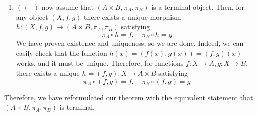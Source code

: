 \begin{example}
\begin{enumerate}
			\item $(\leftarrow)$ now assume that $(A \times B, \pi_A, \pi_B)$ is a terminal object. Then, for any object $(X, f, g)$ there exists a unique morphism $h: (X, f, g) \to (A \times B, \pi_A, \pi_B)$ satisfying 
				\begin{equation}
				  \pi_A \circ h = f, \quad \pi_B \circ h = g
				\end{equation}
				We have proven existence and uniqueness, so we are done. Indeed, we can easily check that the function $h(x) = (f(x), g(x)) = (f, g)(x)$ works, and it must be unique. Therefore, for functions $f: X \to A, g: X \to B$, there exists a unique $h = (f, g) : X \to A \times B$ satisfying 
				\begin{equation}
				  \pi_A \circ (f, g) = f, \quad \pi_B \circ (f, g) = g
				\end{equation}
		\end{enumerate}
		Therefore, we have reformulated our theorem with the equivalent statement that $(A \times B, \pi_A, \pi_B)$ is terminal. 
  \end{example}

